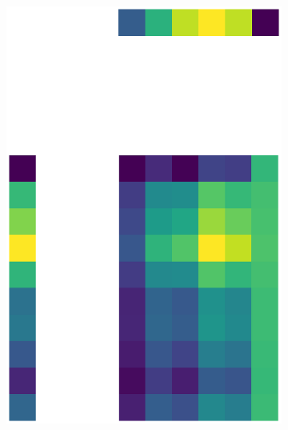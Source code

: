\documentclass[10pt,twocolumn]{article}
\begin{document}
\begin{figure}[H]
\begin{subfigure}[t]{.15\textwidth}
\caption{ }
\end{subfigure}
\begin{subfigure}[t]{.15\textwidth}
\centering
\includegraphics[scale=.2]{DWGs/semi-structured-matrix-reconstruction-PCs-1.eps}
\caption{ }
\end{subfigure}
\begin{subfigure}[t]{.15\textwidth}
\centering

\end{subfigure}
\end{figure}
\end{document}
